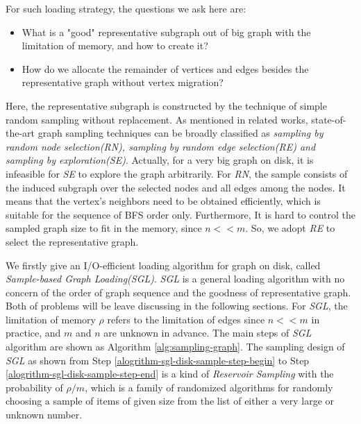 \documentclass{sig-alternate-2013}
\begin{document}
For such loading strategy, the questions we ask here are:
\begin{itemize}
\item What is a "good" representative subgraph out of big graph with the limitation of memory, and how to create it?
\item How do we allocate the remainder of vertices and edges besides the representative graph without vertex migration?
\end{itemize}

Here, the representative subgraph is constructed by the technique of simple random sampling without replacement. As mentioned in related works, state-of-the-art graph sampling techniques can be broadly classified as \textit{sampling by random node selection(RN), sampling by random edge selection(RE) and sampling by exploration(SE)}. Actually, for a very big graph on disk, it is infeasible for \textit{SE} to explore the graph arbitrarily. For \textit{RN}, the sample consists of the induced subgraph over the selected nodes and all edges among the nodes. It means that the vertex's neighbors need to be obtained efficiently, which is suitable for the sequence of BFS order only. Furthermore, It is hard to control the sampled graph size to fit in the memory, since $n<<m$. So, we adopt \textit{RE} to select the representative graph.

We firstly give an I/O-efficient loading algorithm for graph on disk, called \textit{Sample-based Graph Loading(SGL)}. \textit{SGL} is a general loading algorithm with no concern of the order of graph sequence and the goodness of representative graph. Both of problems will be leave discussing in the following sections. For \textit{SGL}, the limitation of memory $\rho$ refers to the limitation of edges since $n<<m$ in practice, and $m$ and $n$ are unknown in advance.
The main steps of \textit{SGL} algorithm are shown as Algorithm \ref{alg:sampling-graph}. The sampling design of \textit{SGL} as shown from Step \ref{alogrithm-sgl-disk-sample-step-begin} to Step \ref{alogrithm-sgl-disk-sample-step-end} is a kind of \textit{Reservoir Sampling} \cite{Yves:samplebook} with the probability of $\rho/m$, which is a family of randomized algorithms for randomly choosing a sample of items of given size from the list of either a very large or unknown number.
\end{document}
